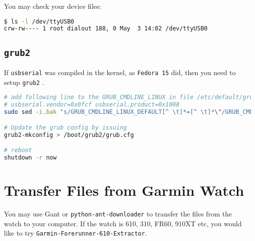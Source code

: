 \documentclass[letter,12pt,onecolumn]{article}
\newcommand{\cnt}[3]{{#1}{#2}{#3}}
\renewcommand{\cnt}[3]{#2}
\renewcommand{\cnt}[3]{#3}
\renewcommand{\cnt}[3]{#1}
\begin{document}
\cnt{You may check your device files:}
    {然后查看设备文件}
    {然後查看設備文件}
\begin{lstlisting}[language=bash]
$ ls -l /dev/ttyUSB0 
crw-rw---- 1 root dialout 188, 0 May  3 14:02 /dev/ttyUSB0
\end{lstlisting}

\subsection{\texttt{grub2}}

\cnt{If \texttt{usbserial} was compiled in the kernel, as \texttt{Fedora 15} did,}
    {如果 \texttt{usbserial} 模块编译进了内核，如像 \texttt{Fedora 15} 那样，}
    {如果 \texttt{usbserial} 模塊編譯進了內核，如像 \texttt{Fedora 15} 那樣，}
\cnt{then you need to setup \texttt{grub2} \cite{jbrown405linux}.}
    {则需要设置 \texttt{grub2} \cite{jbrown405linux}。}
    {則需要設置 \texttt{grub2} \cite{jbrown405linux}。}
\begin{lstlisting}[language=bash]
# add following line to the GRUB_CMDLINE_LINUX in file /etc/default/grub
# usbserial.vendor=0x0fcf usbserial.product=0x1008
sudo sed -i.bak "s/GRUB_CMDLINE_LINUX_DEFAULT[^ \t]*=[^ \t]*\"/GRUB_CMDLINE_LINUX_DEFAULT=\"usbserial.vendor=0x0fcf usbserial.product=0x1008 /g" /etc/default/grub

# Update the grub config by issuing
grub2-mkconfig > /boot/grub2/grub.cfg

# reboot
shutdown -r now
\end{lstlisting}

\section{\cnt{Transfer Files from Garmin Watch}{从表中获取文件}{從錶中獲取檔案}}
\cnt{You may use Gant\cite{gant405} or \texttt{python-ant-downloader}\cite{braiden405cxsrc} to transfer the files from the watch to your computer.}
    {如果要从 Garmin Forerunner 405 传输文件，可以使用 Gant\cite{gant405} 或者 \texttt{python-ant-downloader}\cite{braiden405cxsrc} 来从表中获取文件。}
    {如果要從 Garmin Forerunner 405 傳輸文件，可以使用 Gant\cite{gant405} 或者 \texttt{python-ant-downloader}\cite{braiden405cxsrc} 來從表中獲取文件。}
\cnt{If the watch is 610, 310, FR60, 910XT etc, you would like to try \texttt{Garmin-Forerunner-610-Extractor}\cite{gant610}.}
    {如果使用 610, 310, FR60, 910XT 等新型号的，则可以使用 \texttt{Garmin-Forerunner-610-Extractor}\cite{gant610}。}
    {如果使用 610, 310, FR60, 910XT 等新型號的，則可以使用 \texttt{Garmin-Forerunner-610-Extractor}\cite{gant610}。}
\end{document}
